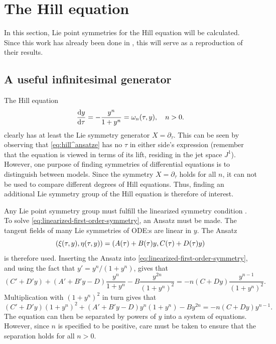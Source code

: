 \section{The Hill equation}

In this section, Lie point symmetries for the Hill equation will be calculated.
Since this work has already been done in \cite{ohlsson2020symmetry}, this will serve as a reproduction of their results.

\subsection{A useful infinitesimal generator}

The Hill equation
\begin{equation} \label{eq:hill^ansatze}
  \diff{y}{\tau} = - \frac{y^n}{1 + y^n} = \omega_n(\tau, y), \quad
  n > 0.
\end{equation}
clearly has at least the Lie symmetry generator \(X=\partial_\tau\).
This can be seen by observing that \cref{eq:hill^ansatze} has no \(\tau\) in either side's expression (remember that the equation is viewed in terms of its lift, residing in the jet space \(J^1\)).
However, one purpose of finding symmetries of differential equations is to distinguish between models.
Since the symmetry \(X=\partial_\tau\) holds for all \(n\), it can not be used to compare different degrees of Hill equations.
Thus, finding an additional Lie symmetry group of the Hill equation is therefore of interest.

Any Lie point symmetry group must fulfill the linearized symmetry condition .
To solve \cref{eq:linearized-first-order-symmetry}, an Ansatz must be made.
The tangent fields of many Lie symmetries of ODE:s are linear in \(y\).
The Ansatz
\begin{equation*}
  \pqty{\xi(\tau,y),\eta(\tau,y)} = \pqty{A(\tau) + B(\tau)y,C(\tau) + D(\tau)y}
\end{equation*}
is therefore used.
Inserting the Ansatz into \cref{eq:linearized-first-order-symmetry}, and using the fact that \(y' = y^n / (1 + y^n)\), gives that
\begin{equation*}
  (C' + D'y) + (A' + B'y - D) \frac{y^n}{1 + y^n} - B \frac{y^{2n}}{(1 + y^n)^2} =
  -n(C + Dy) \frac{y^{n-1}}{(1 + y^n)^2}.
\end{equation*}
Multiplication with \((1 + y^n)^2\) in turn gives that
\begin{equation} \label{eq:hill-linear-symmetry}
  (C' + D'y)(1 + y^n)^2 + (A' + B'y - D)y^n(1 + y^n) - By^{2n} =
  -n(C + Dy) y^{n-1}.
\end{equation}
The equation can then be separated by powers of \(y\) into a system of equations.
However, since \(n\) is specified to be positive, care must be taken to ensure that the separation holds for all \(n>0\).

